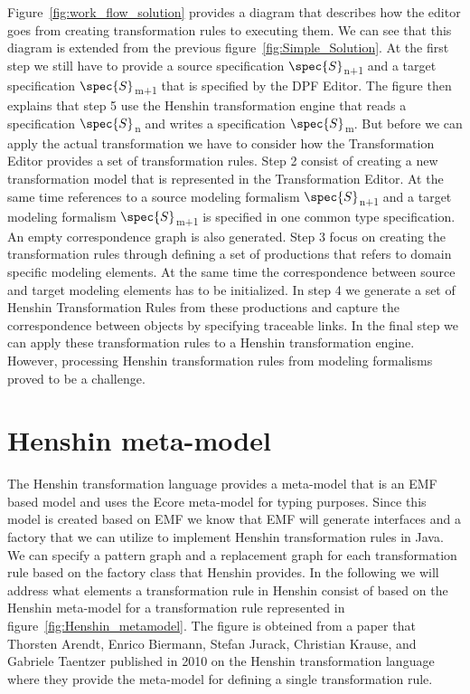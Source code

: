 Figure~\ref{fig:work_flow_solution} provides a diagram that describes how the
editor goes from creating transformation rules to executing them. We can see
that this diagram is extended from the previous
figure~\ref{fig:Simple_Solution}. At the first step we still have to provide a
source specification $\spec{S}$\textsubscript{n+1} and a target specification
$\spec{S}$\textsubscript{m+1} that is specified by the DPF Editor. The figure
then explains that step 5 use the Henshin transformation engine that reads a
specification $\spec{S}$\textsubscript{n} and writes a specification
$\spec{S}$\textsubscript{m}. But before we can apply the actual transformation
we have to consider how the Transformation Editor provides a set of
transformation rules. Step 2 consist of creating a new transformation model that
is represented in the Transformation Editor. At the same time references to a
source modeling formalism $\spec{S}$\textsubscript{n+1} and a target modeling
formalism $\spec{S}$\textsubscript{m+1} is specified in one common type
specification. An empty correspondence graph is also generated. Step 3 focus
on creating the transformation rules through defining a set of productions that
refers to domain specific modeling elements. At the same time the correspondence
between source and target modeling elements has to be initialized. In step 4 we
generate a set of Henshin Transformation Rules from these productions and
capture the correspondence between objects by specifying traceable links. In the
final step we can apply these transformation rules to a Henshin transformation
engine. However, processing Henshin transformation rules from modeling
formalisms proved to be a challenge. 




\section{Henshin meta-model}
\label{sec:henshin_meta}

The Henshin transformation language provides a meta-model that is an EMF based
model and uses the Ecore meta-model for typing purposes\cite{Arendt2010}. Since
this model is created based on EMF we know that EMF will generate interfaces and
a factory that we can utilize to implement Henshin transformation rules in Java.
We can specify a pattern graph and a replacement graph for each transformation
rule based on the factory class that Henshin provides. In the following we
will address what elements a transformation rule in Henshin consist of based on
the Henshin meta-model for a transformation rule represented in
figure~\ref{fig:Henshin_metamodel}. The figure is obteined from a paper that
Thorsten Arendt, Enrico Biermann, Stefan Jurack, Christian Krause, and Gabriele
Taentzer published in 2010 on the Henshin transformation language where they
provide the meta-model for defining a single transformation
rule\cite{Arendt2010}.

